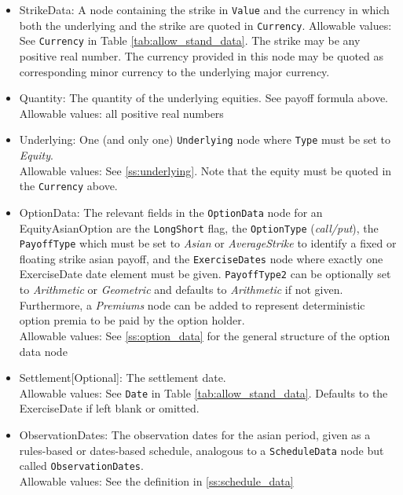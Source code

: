 \begin{itemize}
	\item StrikeData: A node containing the strike in \lstinline!Value! and the currency in which both the underlying and the strike are quoted in \lstinline!Currency!. Allowable values: See \lstinline!Currency! in Table \ref{tab:allow_stand_data}. The strike may be any positive real number. The currency provided in this node may be quoted as corresponding minor currency to the underlying major currency.
	\item Quantity: The quantity of the underlying equities. See payoff formula above. \\
	Allowable values: all positive real numbers
	\item Underlying: One (and only one) \lstinline!Underlying! node where \lstinline!Type! must be set to \emph{Equity}. \\
	Allowable values: See \ref{ss:underlying}. Note that the equity must be quoted in the \lstinline!Currency! above.
	\item OptionData: The relevant fields in the \lstinline!OptionData! node for an EquityAsianOption are the \lstinline!LongShort! flag, the \lstinline!OptionType! (\emph{call/put}), the \lstinline!PayoffType! which must be set to \emph{Asian} or \emph{AverageStrike} to
	identify a fixed or floating strike asian payoff, and the \lstinline!ExerciseDates! node where exactly one ExerciseDate date element must be given. \lstinline!PayoffType2! can be optionally set to \emph{Arithmetic} or \emph{Geometric} and defaults to \emph{Arithmetic} if not given. Furthermore, a \emph{Premiums} node can be added to represent deterministic option premia to be paid by the option holder.\\
	Allowable values: See \ref{ss:option_data} for the general structure of the option data node
	\item Settlement[Optional]: The settlement date.  \\
	Allowable values: See \lstinline!Date! in Table \ref{tab:allow_stand_data}. Defaults to the ExerciseDate if left blank or omitted.
	\item ObservationDates: The observation dates for the asian period, given as a rules-based or dates-based schedule, analogous to a \lstinline!ScheduleData! node but called \lstinline!ObservationDates!.  \\
	Allowable values: See the definition in \ref{ss:schedule_data}
\end{itemize}
